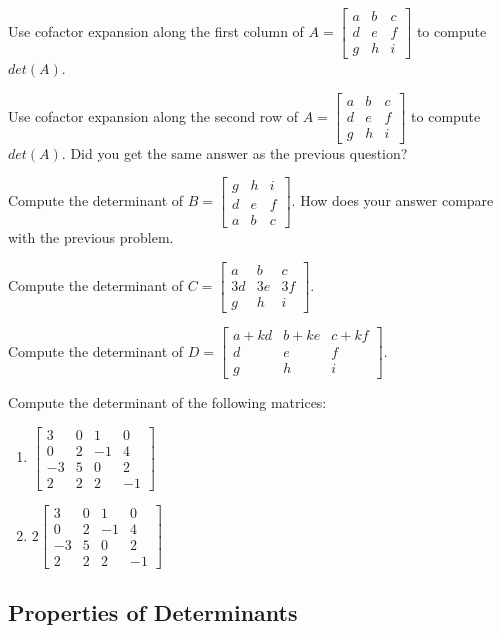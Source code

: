 \question Use cofactor expansion along the first column of \break $A=\begin{bmatrix} a&b&c\\d&e&f\\g&h&i \end{bmatrix}$ to compute $det(A)$.

\question Use cofactor expansion along the second row of \break $A=\begin{bmatrix} a&b&c\\d&e&f\\g&h&i \end{bmatrix}$ to compute $det(A)$. Did you get the same answer as the previous question?

\question Compute the determinant of $B=\begin{bmatrix}g&h&i \\d&e&f\\ a&b&c \end{bmatrix}$. How does your answer compare with the previous problem.

\question Compute the determinant of $C=\begin{bmatrix} a&b&c\\3d&3e&3f\\g&h&i \end{bmatrix}$.

\question Compute the determinant of $D=\begin{bmatrix} a+kd&b+ke&c+kf\\d&e&f\\g&h&i \end{bmatrix}$.

\bq Compute the determinant of the following matrices:
\begin{enumerate}
\item $\begin{bmatrix} 3&0&1&0\\0&2&-1&4 \\-3&5&0&2\\2&2&2&-1 \end{bmatrix}$
\item $2\begin{bmatrix} 3&0&1&0\\0&2&-1&4 \\-3&5&0&2\\2&2&2&-1 \end{bmatrix}$
\end{enumerate}
\eq
\subsection{Properties of Determinants}

